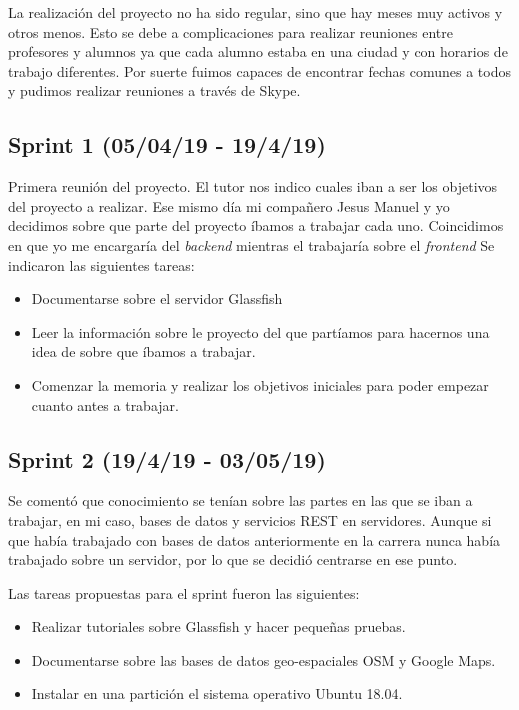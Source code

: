 La realización del proyecto no ha sido regular, sino que hay meses muy activos y otros menos. Esto se debe a complicaciones para realizar reuniones entre profesores y alumnos ya que cada alumno estaba en una ciudad y con horarios de trabajo diferentes. Por suerte fuimos capaces de encontrar fechas comunes a todos y pudimos realizar reuniones a través de Skype.
\subsection{Sprint 1 (05/04/19 - 19/4/19)}
Primera reunión del proyecto. El tutor nos indico cuales iban a ser los objetivos del proyecto a realizar.
Ese mismo día mi compañero Jesus Manuel y yo decidimos sobre que parte del proyecto íbamos a trabajar cada uno.
Coincidimos en que yo me encargaría del \textit{backend} mientras el trabajaría sobre el \textit{frontend}
Se indicaron las siguientes tareas:

\begin{itemize}
\item Documentarse sobre el servidor Glassfish
\item Leer la información sobre le proyecto del que partíamos para hacernos una idea de sobre que íbamos a trabajar.
\item Comenzar la memoria y realizar los objetivos iniciales para poder empezar cuanto antes a trabajar.
\end{itemize}

\subsection{Sprint 2 (19/4/19 - 03/05/19)}
Se comentó que conocimiento se tenían sobre las partes en las que se iban a trabajar, en mi caso, bases de datos y servicios REST en servidores.
Aunque si que había trabajado con bases de datos anteriormente en la carrera nunca había trabajado sobre un servidor, por lo que se decidió centrarse en ese punto.

Las tareas propuestas para el sprint fueron las siguientes:
\begin{itemize}
\item Realizar tutoriales sobre Glassfish y hacer pequeñas pruebas.
\item Documentarse sobre las bases de datos geo-espaciales OSM y Google Maps.
\item Instalar en una partición el sistema operativo Ubuntu 18.04.
\end{itemize}

